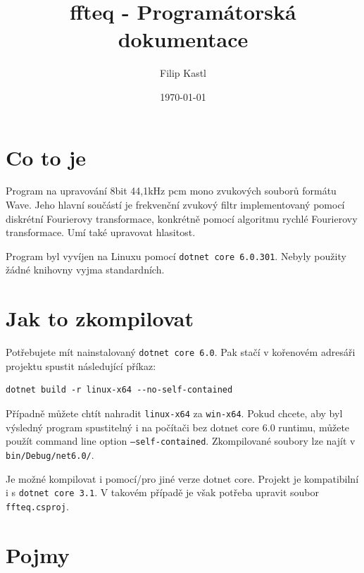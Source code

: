 \documentclass{article}
\title{ffteq - Programátorská dokumentace}
\author{Filip Kastl}
\date{\today}
\begin{document}
\maketitle


\section*{Co to je}

Program na upravování 8bit 44,1kHz pcm mono zvukových souborů formátu Wave.
Jeho hlavní součástí je frekvenční zvukový filtr implementovaný pomocí
diskrétní Fourierovy transformace, konkrétně pomocí algoritmu rychlé Fourierovy
transformace. Umí také upravovat hlasitost.

Program byl vyvíjen na Linuxu pomocí \texttt{dotnet core 6.0.301}. Nebyly
použity žádné knihovny vyjma standardních.


\section*{Jak to zkompilovat}

Potřebujete mít nainstalovaný \texttt{dotnet core 6.0}. Pak stačí v kořenovém
adresáři projektu spustit následující příkaz:
\begin{verbatim}
dotnet build -r linux-x64 --no-self-contained
\end{verbatim}
Případně můžete chtít nahradit \texttt{linux-x64} za \texttt{win-x64}. Pokud
chcete, aby byl výsledný program spustitelný i na počítači bez dotnet core 6.0
runtimu, můžete použít command line option \texttt{--self-contained}.
Zkompilované soubory lze najít v \texttt{bin/Debug/net6.0/}.

Je možné kompilovat i pomocí/pro jiné verze dotnet core. Projekt je
kompatibilní i s \texttt{dotnet core 3.1}. V takovém případě je však potřeba
upravit soubor \texttt{ffteq.csproj}.


\section*{Pojmy}
\end{document}
